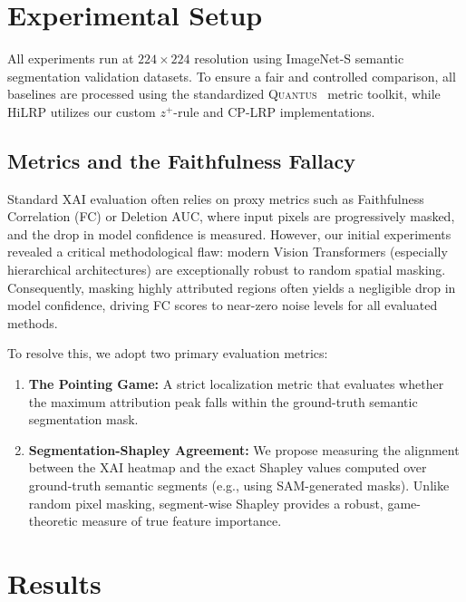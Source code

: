 \documentclass[lettersize,journal]{IEEEtran}
\begin{document}
\section{Experimental Setup}
\label{sec:setup}
All experiments run at $224 \times 224$ resolution using ImageNet-S semantic segmentation validation datasets. To ensure a fair and controlled comparison, all baselines are processed using the standardized \textsc{Quantus}~\cite{hedstrom2023quantus} metric toolkit, while HiLRP utilizes our custom $z^+$-rule and CP-LRP implementations.

\subsection{Metrics and the Faithfulness Fallacy}
Standard XAI evaluation often relies on proxy metrics such as Faithfulness Correlation (FC) or Deletion AUC, where input pixels are progressively masked, and the drop in model confidence is measured. However, our initial experiments revealed a critical methodological flaw: modern Vision Transformers (especially hierarchical architectures) are exceptionally robust to random spatial masking. Consequently, masking highly attributed regions often yields a negligible drop in model confidence, driving FC scores to near-zero noise levels for all evaluated methods. 

To resolve this, we adopt two primary evaluation metrics:
\begin{enumerate}
    \item \textbf{The Pointing Game:} A strict localization metric that evaluates whether the maximum attribution peak falls within the ground-truth semantic segmentation mask.
    \item \textbf{Segmentation-Shapley Agreement:} We propose measuring the alignment between the XAI heatmap and the exact Shapley values computed over ground-truth semantic segments (e.g., using SAM-generated masks). Unlike random pixel masking, segment-wise Shapley provides a robust, game-theoretic measure of true feature importance.
\end{enumerate}

\section{Results}
\label{sec:results}
\end{document}
